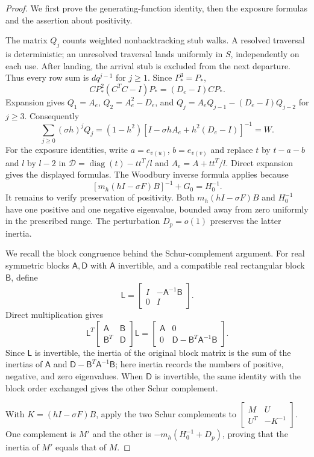 \begin{proof}
We first prove the generating-function identity, then the exposure
formulas and the assertion about positivity.

The matrix $Q_j$ counts weighted nonbacktracking stub walks. A resolved
traversal is deterministic; an unresolved traversal lands uniformly in
$S$, independently on each use. After landing, the arrival stub is
excluded from the next departure. Thus every row sum is $dq^{j-1}$ for
$j\ge1$. Since $P_*^3=P_*$,
\[
 CP_*^2(C^TC-I)P_*=(D_e-I)CP_*.
\]
Expansion gives $Q_1=A_e$, $Q_2=A_e^2-D_e$, and
$Q_j=A_eQ_{j-1}-(D_e-I)Q_{j-2}$ for $j\ge3$. Consequently
\[
 \sum_{j\ge0}(\sigma h)^jQ_j
 =(1-h^2)[I-\sigma hA_e+h^2(D_e-I)]^{-1}=W.
\]
For the exposure identities, write $a=e_{v(u)}$, $b=e_{v(v)}$ and
replace $t$ by $t-a-b$ and $l$ by $l-2$ in
$\mathcal D=\operatorname{diag}(t)-tt^T/l$ and
$A_e=A+tt^T/l$. Direct expansion gives the displayed formulas.
The Woodbury inverse formula \cite{HS1981} applies because
\[
 [m_h(hI-\sigma F)B]^{-1}+G_0=H_0^{-1}.
\]
It remains to verify preservation of positivity.
Both $m_h(hI-\sigma F)B$ and $H_0^{-1}$ have one positive and one
negative eigenvalue, bounded away from zero uniformly in the prescribed
range. The perturbation $D_p=o(1)$ preserves the latter inertia.

We recall the block congruence behind the Schur-complement argument.
For real symmetric blocks $\mathsf A,\mathsf D$ with $\mathsf A$
invertible, and a compatible real rectangular block $\mathsf B$, define
\[
 \mathsf L=
 \begin{bmatrix}I&-\mathsf A^{-1}\mathsf B\\0&I\end{bmatrix}.
\]
Direct multiplication gives
\[
 \mathsf L^T
 \begin{bmatrix}\mathsf A&\mathsf B\\\mathsf B^T&\mathsf D\end{bmatrix}
 \mathsf L
 =\begin{bmatrix}
 \mathsf A&0\\0&\mathsf D-\mathsf B^T\mathsf A^{-1}\mathsf B
 \end{bmatrix}.
\]
Since $\mathsf L$ is invertible, the inertia of the original block
matrix is the sum of the inertias of $\mathsf A$ and
$\mathsf D-\mathsf B^T\mathsf A^{-1}\mathsf B$; here inertia records
the numbers of positive, negative, and zero eigenvalues. When
$\mathsf D$ is invertible, the same identity with the block order
exchanged gives the other Schur complement.

With
$K=(hI-\sigma F)B$, apply the two Schur complements to
$\left[\begin{smallmatrix}M&U\\U^T&-K^{-1}\end{smallmatrix}\right]$.
One complement is $M'$ and the other is
$-m_h(H_0^{-1}+D_p)$, proving that the inertia of $M'$ equals that of
$M$.
\end{proof}

